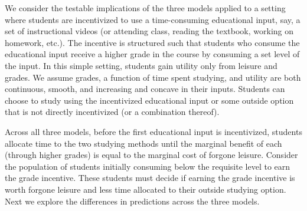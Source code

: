 \documentclass[12pt]{article}
\begin{document}
We consider the testable implications of the three models applied to a setting where students are incentivized to use a time-consuming educational input, say, a set of instructional videos (or attending class, reading the textbook, working on homework, etc.). The incentive is structured such that students who consume the educational input receive a higher grade in the course by consuming a set level of the input. In this simple setting, students gain utility only from leisure and grades. We assume grades, a function of time spent studying, and utility are both continuous, smooth, and increasing and concave in their inputs. Students can choose to study using the incentivized educational input or some outside option that is not directly incentivized (or a combination thereof).

Across all three models, before the first educational input is incentivized, students allocate time to the two studying methods until the marginal benefit of each (through higher grades) is equal to the marginal cost of forgone leisure. Consider the population of students initially consuming below the requisite level to earn the grade incentive. These students must decide if earning the grade incentive is worth forgone leisure and less time allocated to their outside studying option. Next we explore the differences in predictions across the three models.



\end{document}
